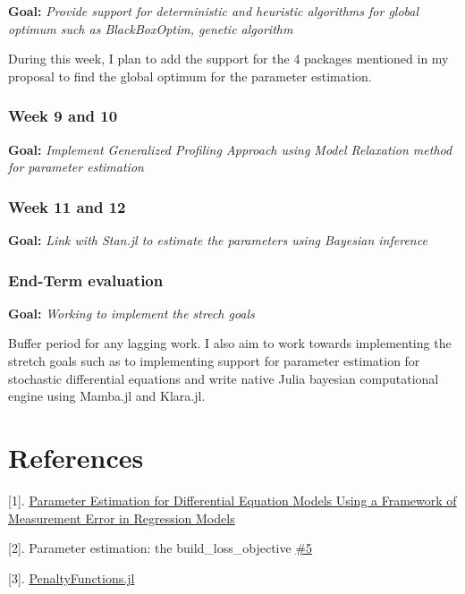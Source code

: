 \documentclass[11pt]{article}
\begin{document}
\textbf{Goal:} \emph{Provide support for deterministic and heuristic
algorithms for global optimum such as BlackBoxOptim, genetic algorithm }

During this week, I plan to add the support for the 4 packages mentioned
in my proposal to find the global optimum for the parameter estimation.

    \subsubsection{Week 9 and 10}\label{week-9-and-10}

\textbf{Goal:} \emph{Implement Generalized Profiling Approach using
Model Relaxation method for parameter estimation}

    \subsubsection{Week 11 and 12}\label{week-11-and-12}

\textbf{Goal:} \emph{Link with Stan.jl to estimate the parameters using
Bayesian inference}

    \subsubsection{End-Term evaluation}\label{end-term-evaluation}

\textbf{Goal:} \emph{Working to implement the strech goals}

Buffer period for any lagging work. I also aim to work towards
implementing the stretch goals such as to implementing support for
parameter estimation for stochastic differential equations and write
native Julia bayesian computational engine using Mamba.jl and Klara.jl.

    \section{References}\label{references}

{[}1{]}.
\href{https://www.ncbi.nlm.nih.gov/pmc/articles/PMC2631937/}{Parameter
Estimation for Differential Equation Models Using a Framework of
Measurement Error in Regression Models}

{[}2{]}. Parameter estimation: the build\_loss\_objective
\href{https://github.com/JuliaDiffEq/DiffEqParamEstim.jl/issues/5}{\#5}

{[}3{]}.
\href{https://github.com/JuliaML/PenaltyFunctions.jl}{PenaltyFunctions.jl}
\end{document}
